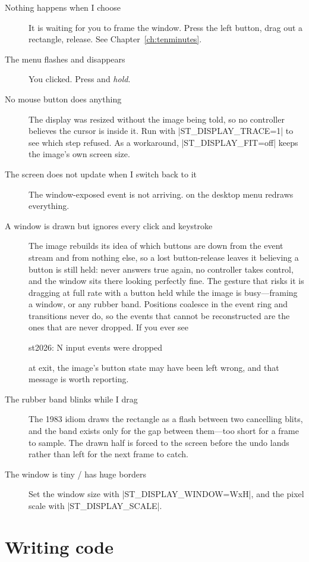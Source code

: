 \begin{description}
\item[Nothing happens when I choose ] It is waiting for you to
  frame the window. Press the left button, drag out a rectangle, release. See
  Chapter~\ref{ch:tenminutes}.
\item[The menu flashes and disappears] You clicked. Press and \emph{hold}.
\item[No mouse button does anything] The display was resized without the image
  being told, so no controller believes the cursor is inside it. Run with
  \ct|ST_DISPLAY_TRACE=1| to see which step refused. As a workaround,
  \ct|ST_DISPLAY_FIT=off| keeps the image's own screen size.
\item[The screen does not update when I switch back to it] The
  window-exposed event is not arriving.  on the desktop
  menu redraws everything.
\item[A window is drawn but ignores every click and keystroke] The image
  rebuilds its idea of which buttons are down from the event stream and from
  nothing else, so a lost button-release leaves it believing a button is
  still held:  never answers true again, no
  controller takes control, and the window sits there looking perfectly
  fine. The gesture that risks it is dragging at full rate with a button
  held while the image is busy---framing a window, or any rubber band.
  Positions coalesce in the event ring and transitions never do, so the
  events that cannot be reconstructed are the ones that are never dropped.
  If you ever see
\begin{plain}
st2026: N input events were dropped
\end{plain}
  at exit, the image's button state may have been left wrong, and that
  message is worth reporting.
\item[The rubber band blinks while I drag] The 1983 idiom draws the
  rectangle as a flash between two cancelling blits, and the band exists
  only for the gap between them---too short for a frame to sample. The drawn
  half is forced to the screen before the undo lands rather than left for
  the next frame to catch.
\item[The window is tiny / has huge borders] Set the window size with
  \ct|ST_DISPLAY_WINDOW=WxH|, and the pixel scale with
  \ct|ST_DISPLAY_SCALE|.
\end{description}

\section{Writing code}

